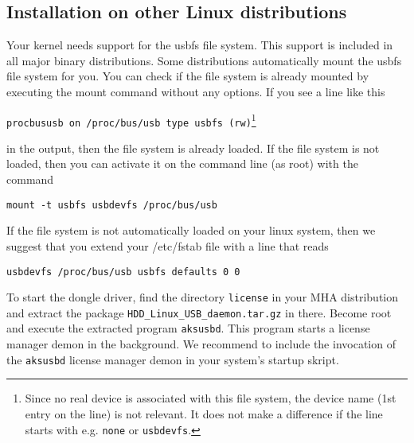\subsection{Installation on other Linux distributions}

Your kernel needs support for the usbfs file system.
This support is included in all major binary distributions.
Some distributions automatically mount the usbfs file system for you.
You can check if the file system is already mounted by executing the
mount command without any options. If you see a line like this 

\texttt{procbususb on /proc/bus/usb type usbfs (rw)}\footnote{
Since no real device is associated with this file system, the device
name (1st entry on the line) is not relevant. It does not make a difference
if the line starts with e.g. \texttt{none} or \texttt{usbdevfs}.}

in the output, then the file system is already loaded.
If the file system is not loaded, then you can activate it on the command 
line (as root) with the command

\texttt{mount -t usbfs usbdevfs /proc/bus/usb}

If the file system is not automatically loaded on your linux system,
then we suggest that you extend your /etc/fstab file with a line that reads

\texttt{usbdevfs  /proc/bus/usb usbfs defaults 0 0}

To start the dongle driver, find the directory \texttt{license}
in your MHA distribution and extract the package
\texttt{HDD\_Linux\_USB\_daemon.tar.gz} in there.
Become root and execute the extracted program \texttt{aksusbd}.
This program starts a license manager demon in the background.
We recommend to include the invocation of the \texttt{aksusbd}
license manager demon in your system's startup skript.

